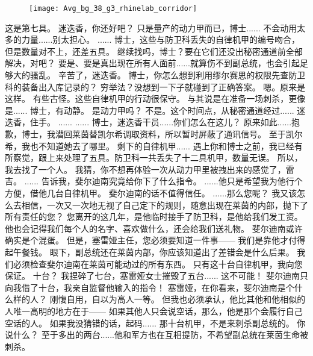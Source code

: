\documentclass[openany]{book}
\begin{document}
\begin{figure}[h]
    \centering
    \texttt{[image: Avg\_bg\_38\_g3\_rhinelab\_corridor]}
\end{figure}
\begin{dialogue}
     这是第七具。
     迷迭香，你还好吧？
     只是量产的动力甲而已，博士......
     不会动用太多的力量......别太担心。
     ......
     博士，这些与防卫科丢失的自律机甲的编号吻合，但是数量对不上，还差五具。
     继续找吗，博士？要在它们还没出秘密通道前全部解决，对吧？
     要是、要是真出现在所有人面前......就算伤不到副总统，也会引起足够大的骚乱。
     辛苦了，迷迭香。
     博士，你怎么想到利用缪尔赛思的权限先查防卫科的装备出入库记录的？
     穷举法？没想到一下子就碰到了正确答案。
     嗯。原来是这样。
     有些古怪。这些自律机甲的行动很保守。
     与其说是在准备一场刺杀，更像是......
     博士，有动静。
     是动力甲吗？
     不是。这个时间点，从秘密通道经过......
     迷迭香，住手。
     ......
     ......
     博士，迷迭香干员......你们怎么在这儿？
     原来如此......抱歉，博士，我潜回莱茵替凯尔希调取资料，所以暂时屏蔽了通讯信号。
     至于凯尔希，我也不知道她去了哪里。
     剩下的自律机甲......
     遇上你和博士之前，我已经有所察觉，跟上来处理了五具。防卫科一共丢失了十二具机甲，数量无误。
     所以，我去找了一个人。
     我猜，你不想再体验一次从动力甲里被拽出来的感觉了，雷吉。
     ......
     告诉我，斐尔迪南究竟给你下了什么指令。
     ......他只是希望我为他行个方便，借他几台自律机甲。
     斐尔迪南的话不值得信任。
     ......那么您呢？
     我又该怎么去相信，一次又一次地无视了自己定下的规则，随意出现在莱茵的内部，抛下了所有责任的您？
     您离开的这几年，是他临时接手了防卫科，是他给我们发工资。
     他也会记得我们每个人的名字、喜欢做什么，还会给我们送礼物。
     斐尔迪南或许确实是个混蛋。
     但是，塞雷娅主任，您必须要知道一件事——
     我们是靠他才付得起午餐钱。
     眼下，副总统还在莱茵内部，你应该知道出了差错会是什么后果。
     我们必须检查斐尔迪南在莱茵可能动过的所有东西。
     只有这十台自律机甲，我向您保证。
     十台？
     我捏碎了七台，塞雷娅女士摧毁了五台......
     这不可能！
     斐尔迪南只向我借了十台，我亲自监督他输入的指令！
     塞雷娅，在你看来，斐尔迪南是个什么样的人？
     刚愎自用，自以为高人一等。
     但我也必须承认，他比其他和他相似的人唯一高明的地方在于——
     如果其他人只会说空话，那么，他是那个会履行自己空话的人。
     如果我没猜错的话，起码......
     那十台机甲，不是来刺杀副总统的。
     你说什么？
     至于多出的两台......他和军方也在互相提防，不希望副总统在莱茵生命被刺杀。
\end{dialogue}
\end{document}
